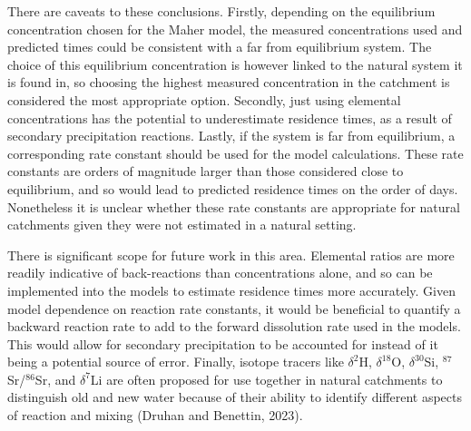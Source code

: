 \bsk


There are caveats to these conclusions. Firstly, depending on the equilibrium concentration chosen for the Maher model, the measured concentrations used and predicted times could be consistent with a far from equilibrium system. The choice of this equilibrium concentration is however linked to the natural system it is found in, so choosing the highest measured concentration in the catchment is considered the most appropriate option. Secondly, just using elemental concentrations has the potential to underestimate residence times, as a result of secondary precipitation reactions. Lastly, if the system is far from equilibrium, a corresponding rate constant should be used for the model calculations. These rate constants are orders of magnitude larger than those considered close to equilibrium, and so would lead to predicted residence times on the order of days. Nonetheless it is unclear whether these rate constants are appropriate for natural catchments given they were not estimated in a natural setting.

\bsk

There is significant scope for future work in this area. Elemental ratios are more readily indicative of back-reactions than concentrations alone, and so can be implemented into the models to estimate residence times more accurately. Given model dependence on reaction rate constants, it would be beneficial to quantify a backward reaction rate to add to the forward dissolution rate used in the models. This would allow for secondary precipitation to be accounted for instead of it being a potential source of error. Finally, isotope tracers like $\delta^2$H, $\delta^{18}$O, $\delta^{30}$Si, $^{87}$Sr/$^{86}$Sr, and $\delta^7$Li are often proposed for use together in natural catchments to distinguish old and new water because of their ability to identify different aspects of reaction and mixing (Druhan and Benettin, 2023). 













